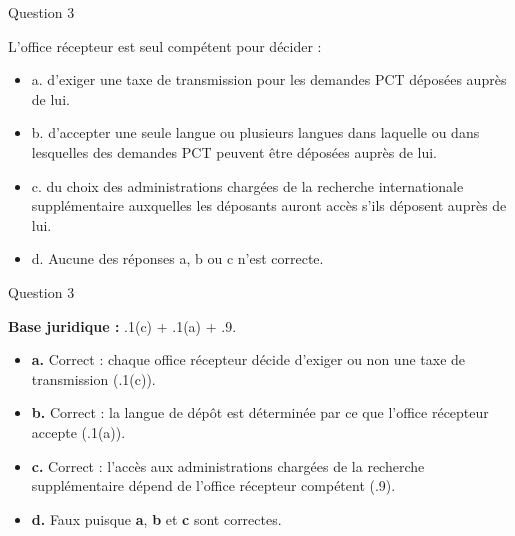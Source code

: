 \begin{frame}{Question 3}

\begin{block}{}
L’office récepteur est seul compétent pour décider :

\begin{itemize}
  \item[$\bullet$] a. d’exiger une taxe de transmission pour les demandes PCT déposées auprès de lui. 
  \item[$\bullet$] b. d’accepter une seule langue ou plusieurs langues dans laquelle ou dans lesquelles 
  des demandes PCT peuvent être déposées auprès de lui. 
  \item[$\bullet$] c. du choix des administrations chargées de la recherche internationale supplémentaire 
  auxquelles les déposants auront accès s’ils déposent auprès de lui. 
  \item[$\circ$] d. Aucune des réponses a, b ou c n’est correcte. 
\end{itemize}

\end{block}

\end{frame}

\begin{frame}{Question 3}

\textbf{Base juridique :} .1(c) + .1(a) + .9.  

\begin{itemize}
  \item[$\bullet$] \textbf{a.} \; Correct : chaque office récepteur décide d’exiger ou non
  une taxe de transmission (.1(c)).

  \item[$\bullet$] \textbf{b.} \; Correct : la langue de dépôt est déterminée par ce que
  l’office récepteur accepte (.1(a)).

  \item[$\bullet$] \textbf{c.} \; Correct : l’accès aux administrations chargées de la recherche
  supplémentaire dépend de l’office récepteur compétent (.9).

  \item[$\circ$] \textbf{d.} \; Faux puisque \textbf{a}, \textbf{b} et \textbf{c} sont correctes.
\end{itemize}

\end{frame}
